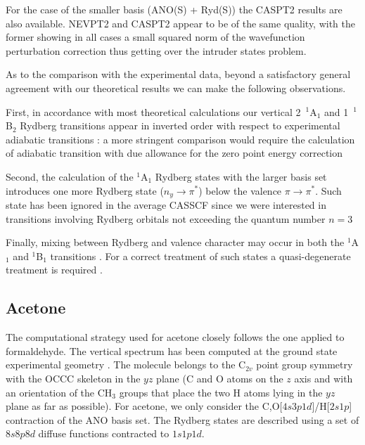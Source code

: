 For the case of the smaller basis (ANO(S) + Ryd(S)) the CASPT2 results are
also available. NEVPT2 and CASPT2 appear to be of the same quality, with the
former showing in all cases a small squared norm of the wavefunction
perturbation correction thus getting over the intruder states problem.

As to the comparison with the experimental data, beyond a satisfactory
general agreement with our theoretical results we can make the following
observations.



First, in accordance with most theoretical calculations our vertical
2~$^1$A$_1$  and 1~$^1$B$_2$ Rydberg transitions appear in inverted order
with respect to experimental adiabatic transitions \cite{robin-hespm}: a
more stringent comparison would require the calculation of adiabatic
transition with due allowance for the zero point energy correction

Second, the calculation of the $^1$A$_1$ Rydberg states with the larger basis
set introduces one more Rydberg state ($n_y\rightarrow\pi^*$) below the
valence $\pi\rightarrow\pi^*$. Such state has been ignored in the average
CASSCF since we were interested in transitions involving Rydberg orbitals
not exceeding the quantum number $n=3$

Finally, mixing between Rydberg and valence character may occur in both the
$^1$A$_1$ and $^1$B$_1$ transitions \cite{tca-92-227-1995,jpc-99-8050-1995}.
For a correct treatment of such states a quasi-degenerate treatment
is required \cite{acp-67-1-1987,cpl-288-299-1998}.



\subsection{Acetone}

The computational strategy used for acetone closely follows the one applied
to formaldehyde. The vertical spectrum has been computed at the ground
state experimental geometry \cite{jms-18-344-1965}. The molecule belongs to
the C$_{2v}$ point group symmetry with the OCCC skeleton in the $yz$
plane (C and O atoms on the $z$ axis and with an orientation of the CH$_3$ 
groups that place the two H atoms lying in the $yz$ plane as far as
possible). For acetone, we only consider the C,O[$4s3p1d$]/H[$2s1p$]
contraction of the ANO basis set. The Rydberg states are described using a
set of $8s8p8d$ diffuse functions contracted to $1s1p1d$. 

